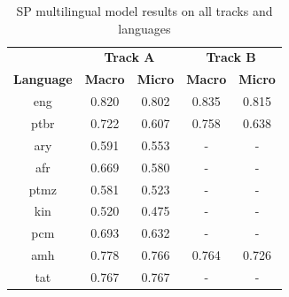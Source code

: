 \documentclass[11pt]{article}
\begin{document}
\begin{table}[]
\caption{SP multilingual model results on all tracks and languages}
\label{tab:SP_Multilingual}
\begin{tabular}{ccccc}
\hline
                                    & \multicolumn{2}{c}{\textbf{Track A}}                        & \multicolumn{2}{c}{\textbf{Track B}}                        \\
\multirow{-2}{*}{\textbf{Language}} & \textbf{Macro}               & \textbf{Micro}               & \textbf{Macro}               & \textbf{Micro}               \\ \hline
eng                                 & {\color[HTML]{212121} 0.820} & {\color[HTML]{212121} 0.802} & {\color[HTML]{212121} 0.835} & {\color[HTML]{212121} 0.815} \\
{\color[HTML]{212121} ptbr} & {\color[HTML]{212121} 0.722} & {\color[HTML]{212121} 0.607} & {\color[HTML]{212121} 0.758} & {\color[HTML]{212121} 0.638} \\
{\color[HTML]{212121} ary}          & {\color[HTML]{212121} 0.591} & {\color[HTML]{212121} 0.553} & {\color[HTML]{212121} -}     & {\color[HTML]{212121} -}     \\
{\color[HTML]{212121} afr}          & {\color[HTML]{212121} 0.669} & {\color[HTML]{212121} 0.580} & {\color[HTML]{212121} -}     & {\color[HTML]{212121} -}     \\
{\color[HTML]{212121} ptmz}         & {\color[HTML]{212121} 0.581} & {\color[HTML]{212121} 0.523} & {\color[HTML]{212121} -}     & {\color[HTML]{212121} -}     \\
{\color[HTML]{212121} kin}          & {\color[HTML]{212121} 0.520} & {\color[HTML]{212121} 0.475} & -                            & -                            \\
{\color[HTML]{212121} pcm}          & {\color[HTML]{212121} 0.693} & {\color[HTML]{212121} 0.632} & -                            & -                            \\
{\color[HTML]{212121} amh}          & {\color[HTML]{212121} 0.778} & {\color[HTML]{212121} 0.766} & {\color[HTML]{212121} 0.764} & {\color[HTML]{212121} 0.726} \\
{\color[HTML]{212121} tat}          & {\color[HTML]{212121} 0.767} & {\color[HTML]{212121} 0.767} & -                            & -                            \\

\end{tabular}
\end{table}
\end{document}
